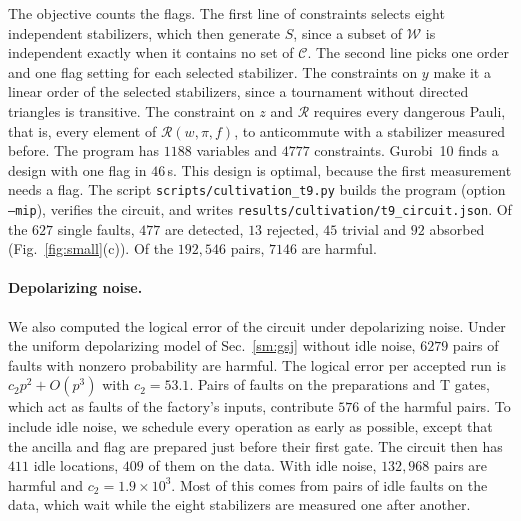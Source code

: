 \documentclass[aps,prl,reprint,twocolumn,amsmath,amssymb,floatfix,nofootinbib,superscriptaddress]{revtex4-2}
\theoremstyle{definition}
\theoremstyle{remark}
\begin{document}
The objective counts the flags. The first line of constraints selects eight independent stabilizers, which then generate $S$, since a subset of $\mathcal W$ is independent exactly when it contains no set of $\mathcal C$. The second line picks one order and one flag setting for each selected stabilizer. The constraints on $y$ make it a linear order of the selected stabilizers, since a tournament without directed triangles is transitive. The constraint on $z$ and $\mathcal R$ requires every dangerous Pauli, that is, every element of $\mathcal R(w,\pi,f)$, to anticommute with a stabilizer measured before. The program has $1188$ variables and $4777$ constraints. Gurobi~10 finds a design with one flag in $46$\,s. This design is optimal, because the first measurement needs a flag. The script \texttt{scripts/cultivation\_t9.py} builds the program (option \texttt{--mip}), verifies the circuit, and writes \texttt{results/cultivation/t9\_circuit.json}. Of the $627$ single faults, $477$ are detected, $13$ rejected, $45$ trivial and $92$ absorbed (Fig.~\ref{fig:small}(c)). Of the $192{,}546$ pairs, $7146$ are harmful.

\paragraph*{Depolarizing noise.}
We also computed the logical error of the circuit under depolarizing noise. Under the uniform depolarizing model of Sec.~\ref{sm:gsj} without idle noise, $6279$ pairs of faults with nonzero probability are harmful. The logical error per accepted run is $c_2p^2+O(p^3)$ with $c_2=53.1$. Pairs of faults on the preparations and T gates, which act as faults of the factory's inputs, contribute $576$ of the harmful pairs. To include idle noise, we schedule every operation as early as possible, except that the ancilla and flag are prepared just before their first gate. The circuit then has $411$ idle locations, $409$ of them on the data. With idle noise, $132{,}968$ pairs are harmful and $c_2=1.9\times10^3$. Most of this comes from pairs of idle faults on the data, which wait while the eight stabilizers are measured one after another.
\end{document}

